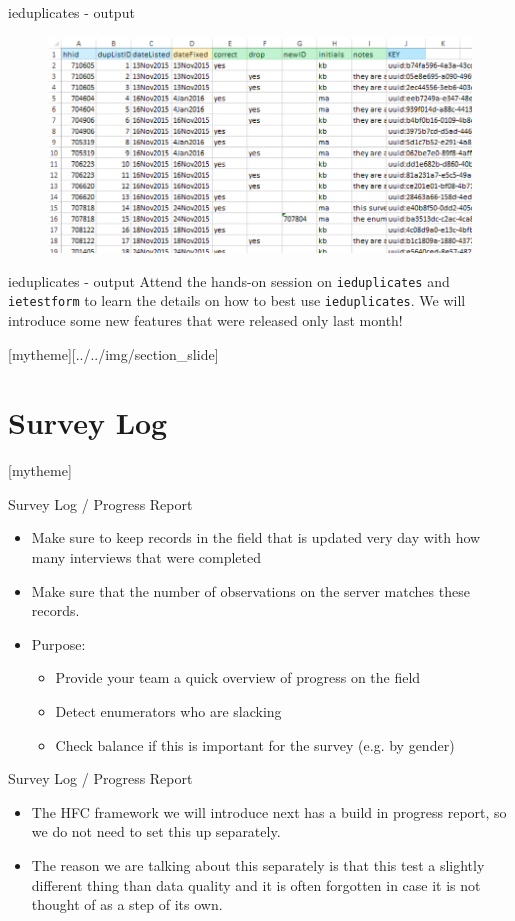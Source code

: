 \documentclass[aspectratio=169]{beamer}
\newcommand{\sectionpic}[2]{
	\setbeamertemplate{section page}[mytheme][#2]
	\section{#1}
	\setbeamertemplate{section page}[mytheme]
}
\begin{document}
\begin{frame}{ieduplicates - output}
	\begin{figure}
		\centering
		\includegraphics[width=.9\linewidth]{img/ieduplicates-output.png}
	\end{figure}
\end{frame}

\begin{frame}{ieduplicates - output}
	Attend the hands-on session on \texttt{ieduplicates} and \texttt{ietestform} to learn the details on how to best use \texttt{ieduplicates}. We will introduce some new features that were released only last month!
\end{frame}

\sectionpic{Survey Log}{../../img/section_slide}



\begin{frame}{Survey Log / Progress Report}
	\begin{itemize}
		\item Make sure to keep records in the field that is updated very day with how many interviews that were completed
		\item Make sure that the number of observations on the server matches these records.
		\item Purpose:
		\begin{itemize}
			\item Provide your team a quick overview of progress on the field
			\item Detect enumerators who are slacking
			\item Check balance if this is important for the survey (e.g. by gender)
		\end{itemize}
	\end{itemize}
\end{frame}


\begin{frame}{Survey Log / Progress Report}
	\begin{itemize}
		\item The HFC framework we will introduce next has a build in progress report, so we do not need to set this up separately. 
		\item The reason we are talking about this separately is that this test a slightly different thing than data quality and it is often forgotten in case it is not thought of as a step of its own.
	\end{itemize}
\end{frame}
\end{document}
